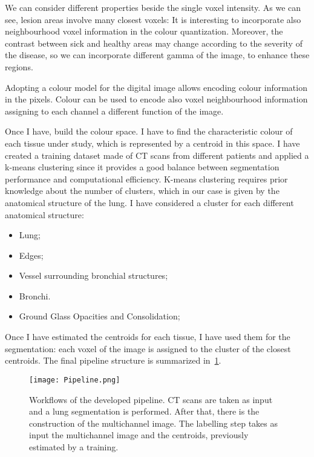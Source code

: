 \documentclass{standalone}
\begin{document}
	We can consider different properties beside the single voxel intensity. As we can see, lesion areas involve many closest voxels: It is interesting to incorporate also neighbourhood voxel information in the colour quantization. Moreover, the contrast between sick and healthy areas may change according to the severity of the disease, so we can incorporate different gamma of the image, to enhance these regions.

	Adopting a colour model for the digital image allows encoding colour information in the pixels. Colour can be used to encode also voxel neighbourhood information assigning to each channel a different function of the image.

	Once I have, build the colour space. I have to find the characteristic colour of each tissue under study, which is represented by a centroid in this space. I have created a training dataset made of CT scans from different patients and applied a k-means clustering since it provides a good balance between segmentation performance and computational efficiency. K-means clustering requires prior knowledge about the number of clusters, which in our case is given by the anatomical structure of the lung. I have considered a cluster for each different anatomical structure: 

		\begin{itemize}
		\item Lung; 
		
		\item  Edges;
		
		\item Vessel surrounding bronchial structures;
		
		\item Bronchi.
		
		\item  Ground Glass Opacities and Consolidation;
		
	\end{itemize}
		
	Once I have estimated the centroids for each tissue, I have used them for the segmentation: each voxel of the image is assigned to the cluster of the closest centroids. The final pipeline structure is summarized in \figurename\,\ref{fig:Pipeline}.
	
	\begin{figure}[h!]
		\centering
		\texttt{[image: Pipeline.png]}
		\caption{Workflows of the developed pipeline. CT scans are taken as input and a lung segmentation is performed. After that, there is the construction of the multichannel image. The labelling step takes as input the multichannel image and the centroids, previously estimated by a training.}\label{fig:Pipeline}
	\end{figure}
\end{document}

